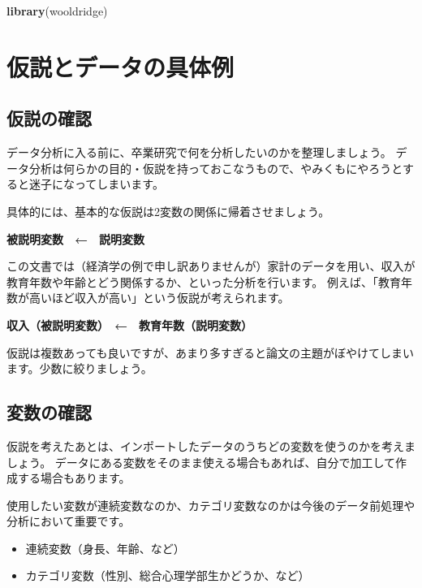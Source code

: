 \documentclass[]{book}
\newenvironment{Shaded}{\begin{snugshade}}{\end{snugshade}}
\newcommand{\KeywordTok}[1]{\textcolor[rgb]{0.13,0.29,0.53}{\textbf{#1}}}
\newcommand{\NormalTok}[1]{#1}
\providecommand{\tightlist}{%
  \setlength{\itemsep}{0pt}\setlength{\parskip}{0pt}}
\begin{document}
\begin{Shaded}
\begin{Highlighting}[]
\KeywordTok{library}\NormalTok{(wooldridge)}
\end{Highlighting}
\end{Shaded}

\chapter{仮説とデータの具体例}\label{Hypotheses}

\section{仮説の確認}\label{ux4eeeux8aacux306eux78baux8a8d}

データ分析に入る前に、卒業研究で何を分析したいのかを整理しましょう。
データ分析は何らかの目的・仮説を持っておこなうもので、やみくもにやろうとすると迷子になってしまいます。

具体的には、基本的な仮説は2変数の関係に帰着させましょう。

\textbf{被説明変数　←　説明変数}

この文書では（経済学の例で申し訳ありませんが）家計のデータを用い、収入が教育年数や年齢とどう関係するか、といった分析を行います。
例えば、「教育年数が高いほど収入が高い」という仮説が考えられます。

\textbf{収入（被説明変数）　←　教育年数（説明変数）}

仮説は複数あっても良いですが、あまり多すぎると論文の主題がぼやけてしまいます。少数に絞りましょう。

\section{変数の確認}\label{ux5909ux6570ux306eux78baux8a8d}

仮説を考えたあとは、インポートしたデータのうちどの変数を使うのかを考えましょう。
データにある変数をそのまま使える場合もあれば、自分で加工して作成する場合もあります。

使用したい変数が連続変数なのか、カテゴリ変数なのかは今後のデータ前処理や分析において重要です。

\begin{itemize}
\tightlist
\item
  連続変数（身長、年齢、など）
\item
  カテゴリ変数（性別、総合心理学部生かどうか、など）
\end{itemize}
\end{document}
